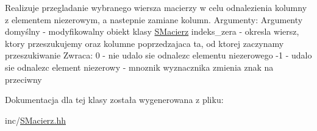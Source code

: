 Realizuje przegladanie wybranego wiersza macierzy w celu odnalezienia kolumny z elementem niezerowym, a nastepnie zamiane kolumn. Argumenty\+: Argumenty domyślny -\/ modyfikowalny obiekt klasy \hyperlink{classSMacierz}{S\+Macierz} indeks\+\_\+zera -\/ okresla wiersz, ktory przeszukujemy oraz kolumne poprzedzajaca ta, od ktorej zaczynamy przeszukiwanie Zwraca\+: 0 -\/ nie udalo sie odnalezc elementu niezerowego -\/1 -\/ udalo sie odnalezc element niezerowy -\/ mnoznik wyznacznika zmienia znak na przeciwny 

Dokumentacja dla tej klasy została wygenerowana z pliku\+:\begin{DoxyCompactItemize}
\item 
inc/\hyperlink{SMacierz_8hh}{S\+Macierz.\+hh}\end{DoxyCompactItemize}
